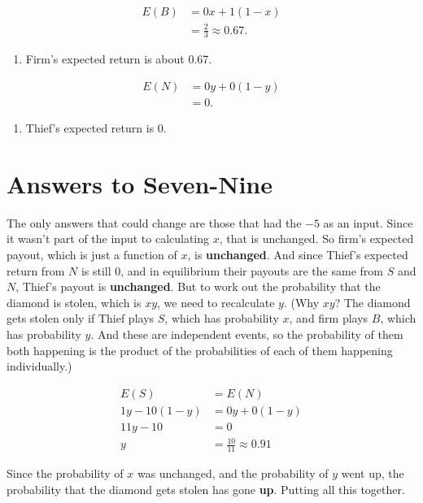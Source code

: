 \documentclass[
  10pt,
]{article}
\providecommand{\tightlist}{%
  \setlength{\itemsep}{0pt}\setlength{\parskip}{0pt}}
\begin{document}
\begin{align*}
E(B) &= 0x + 1(1-x) \\
 &= \frac{2}{3} \approx 0.67.
\end{align*}

\begin{enumerate}
\def\labelenumi{\arabic{enumi}.}
\setcounter{enumi}{4}
\tightlist
\item
  Firm's expected return is about 0.67.
\end{enumerate}

\begin{align*}
E(N) &= 0y + 0(1-y) \\
 &= 0.
\end{align*}

\begin{enumerate}
\def\labelenumi{\arabic{enumi}.}
\setcounter{enumi}{5}
\tightlist
\item
  Thief's expected return is 0.
\end{enumerate}

\hypertarget{answers-to-seven-nine}{%
\section{Answers to Seven-Nine}\label{answers-to-seven-nine}}

The only answers that could change are those that had the \(-5\) as an
input. Since it wasn't part of the input to calculating \(x\), that is
unchanged. So firm's expected payout, which is just a function of \(x\),
is \textbf{unchanged}. And since Thief's expected return from \(N\) is
still 0, and in equilibrium their payouts are the same from \(S\) and
\(N\), Thief's payout is \textbf{unchanged}. But to work out the
probability that the diamond is stolen, which is \(xy\), we need to
recalculate \(y\). (Why \(xy\)? The diamond gets stolen only if Thief
plays \(S\), which has probability \(x\), and firm plays \(B\), which
has probability \(y\). And these are independent events, so the
probability of them both happening is the product of the probabilities
of each of them happening individually.)

\begin{align*}
E(S) &= E(N) \\
1y - 10(1-y) &= 0y + 0(1-y) \\
11y - 10 &= 0 \\
y &= \frac{10}{11} \approx 0.91
\end{align*}

Since the probability of \(x\) was unchanged, and the probability of
\(y\) went up, the probability that the diamond gets stolen has gone
\textbf{up}. Putting all this together.
\end{document}
